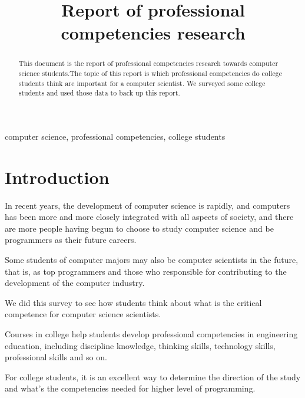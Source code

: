 \documentclass[conference]{IEEEtran}
\begin{document}
\title{Report of professional competencies research\\
}

\author{
\and
{}
\and
{}
\and
{}
}

\maketitle

\begin{abstract}
This document is the report of professional competencies research towards computer science students.The topic of this report is which professional competencies do college students think are important for a computer scientist. We surveyed some college students and used those data to back up this report. 
\end{abstract}

\begin{IEEEkeywords}
computer science, professional competencies, college students
\end{IEEEkeywords}

\section{Introduction}
\par In recent years, the development of computer science is rapidly, and computers has been more and more closely integrated with all aspects of society, and there are more people having begun to choose to study computer science and be programmers as their future careers.
\par Some students of computer majors may also be computer scientists in the future, that is, as top programmers and those who responsible for contributing to the development of the computer industry. 
\par We did this survey to see how students think about what is the critical competence for computer science scientists.
\par Courses in college help students develop professional competencies in engineering education, including discipline knowledge, thinking skills, technology skills, professional skills and so on.
\par For college students, it is an excellent way to determine the direction of the study and what's the competencies needed for higher level of programming.
\end{document}
